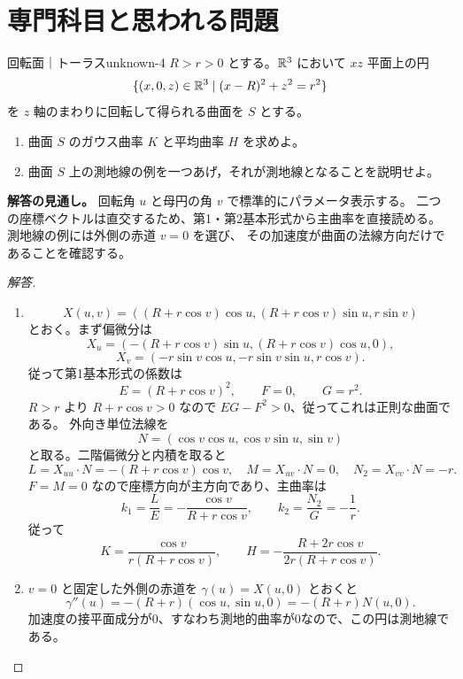 \section{専門科目と思われる問題}

\begin{problem}{回転面｜トーラス}{unknown-4}
$R>r>0$ とする。$\mathbb{R}^3$ において $xz$ 平面上の円
\[
\{(x,0,z)\in\mathbb{R}^3\mid(x-R)^2+z^2=r^2\}
\]
を $z$ 軸のまわりに回転して得られる曲面を $S$ とする。
\begin{enumerate}
  \item[(1)] 曲面 $S$ のガウス曲率 $K$ と平均曲率 $H$ を求めよ。
  \item[(2)] 曲面 $S$ 上の測地線の例を一つあげ，それが測地線となることを説明せよ。
\end{enumerate}
\end{problem}
\begin{memo*}
\textbf{解答の見通し。}
回転角 $u$ と母円の角 $v$ で標準的にパラメータ表示する。
二つの座標ベクトルは直交するため、第1・第2基本形式から主曲率を直接読める。
測地線の例には外側の赤道 $v=0$ を選び、
その加速度が曲面の法線方向だけであることを確認する。
\end{memo*}
\begin{proof}[解答]
\begin{enumerate}
\item[(1)]
\[
X(u,v)=((R+r\cos v)\cos u,(R+r\cos v)\sin u,r\sin v)
\]
とおく。まず偏微分は
\[
X_u=(-(R+r\cos v)\sin u,(R+r\cos v)\cos u,0),
\]
\[
X_v=(-r\sin v\cos u,-r\sin v\sin u,r\cos v).
\]
従って第1基本形式の係数は
\[
E=(R+r\cos v)^2,\qquad F=0,\qquad G=r^2.
\]
$R>r$ より $R+r\cos v>0$ なので $EG-F^2>0$、従ってこれは正則な曲面である。
外向き単位法線を
\[
N=(\cos v\cos u,\cos v\sin u,\sin v)
\]
と取る。二階偏微分と内積を取ると
\[
L=X_{uu}\cdot N=-(R+r\cos v)\cos v,\quad
M=X_{uv}\cdot N=0,\quad
N_2=X_{vv}\cdot N=-r.
\]
$F=M=0$ なので座標方向が主方向であり、主曲率は
\[
k_1=\frac LE=-\frac{\cos v}{R+r\cos v},\qquad
k_2=\frac{N_2}G=-\frac1r.
\]
従って
\[
K=\frac{\cos v}{r(R+r\cos v)},\qquad
H=-\frac{R+2r\cos v}{2r(R+r\cos v)}.
\]
\item[(2)] $v=0$ と固定した外側の赤道を $\gamma(u)=X(u,0)$ とおくと
\[
\gamma''(u)=-(R+r)(\cos u,\sin u,0)=-(R+r)N(u,0).
\]
加速度の接平面成分が0、すなわち測地的曲率が0なので、この円は測地線である。
\end{enumerate}
\end{proof}


